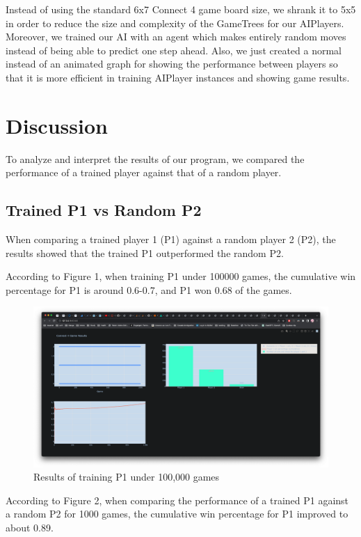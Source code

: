 \documentclass{article}
\begin{document}
Instead of using the standard 6x7 Connect 4 game board size, we shrank it to 5x5 in order to reduce the size and complexity of the GameTrees for our AIPlayers. Moreover, we trained our AI with an agent which makes entirely random moves instead of being able to predict one step ahead. Also, we just created a normal instead of an animated graph for showing the performance between players so that it is more efficient in training AIPlayer instances and showing game results. 

\section{Discussion}

To analyze and interpret the results of our program, we compared the performance of a trained player against that of a random player.

\subsection{Trained P1 vs Random P2}

When comparing a trained player 1 (P1) against a random player 2 (P2), the results showed that the trained P1 outperformed the random P2.

According to Figure 1, when training P1 under 100000 games, the cumulative win percentage for P1 is around 0.6-0.7, and P1 won 0.68 of the games. 

\begin{figure}[h]
    \centering    \includegraphics[scale=0.24]{images/1.png}
    \caption{Results of training P1 under 100,000 games}
    \label{fig:my_label}
\end{figure}

According to Figure 2, when comparing the performance of a trained P1 against a random P2 for 1000 games, the cumulative win percentage for P1 improved to about 0.89.
\end{document}
